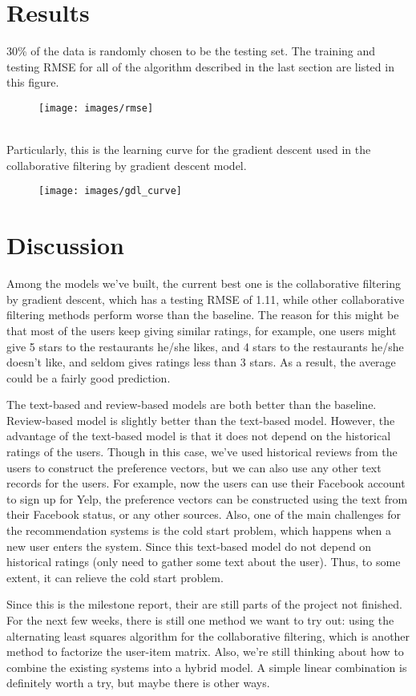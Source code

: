 \documentclass[conference]{IEEEtran}
\begin{document}
\section{Results}
30\% of the data is randomly chosen to be the testing set. The training and testing RMSE for all of the algorithm described in the last section 
are listed in this figure.
\begin{figure}[!htb]
	\texttt{[image: images/rmse]}
\end{figure} \\
Particularly, this is the learning curve for the gradient descent used in the
collaborative filtering by gradient descent model.
\begin{figure}[!htb]
	\texttt{[image: images/gdl\_curve]}
\end{figure}

\section{Discussion}
Among the models we've built, the current best one is the 
collaborative filtering by gradient descent, which has a testing RMSE of 1.11,
while other collaborative filtering methods perform worse than the baseline.
The reason for this might be that most of the users keep giving similar ratings, 
for example, one users might give 5 stars to the restaurants he/she likes, 
and 4 stars to the restaurants he/she doesn't like, and seldom gives ratings
less than 3 stars. As a result, the average could be a fairly good prediction.
\par
The text-based and review-based models are both better than the baseline.
Review-based model is slightly better than the text-based model. However, 
the advantage of the text-based model is that it does not depend on the 
historical ratings of the users. 
Though in this case, we've used historical reviews from the users to construct
the preference vectors, but we can also use any other text records for the users.
For example, now the users can use their Facebook account to sign up for 
Yelp, the preference vectors can be constructed using the text from
their Facebook status, or any other sources.
Also, one of the main challenges for the recommendation systems is the 
cold start problem\cite{cold_start}, which happens when a new user enters the system. 
Since this text-based model do not depend on historical ratings
(only need to gather some text about the user). Thus,
to some extent, it can relieve the cold start problem.
\par
Since this is the milestone report, their are still parts of the project
not finished. For the next few weeks, there is still one method
we want to try out: using the alternating least squares 
algorithm for the collaborative filtering, which is 
another method to factorize the user-item matrix. Also, we're still thinking
about how to combine the existing systems into a hybrid model. A simple 
linear combination is definitely worth a try, but maybe there is other ways.
\end{document}
